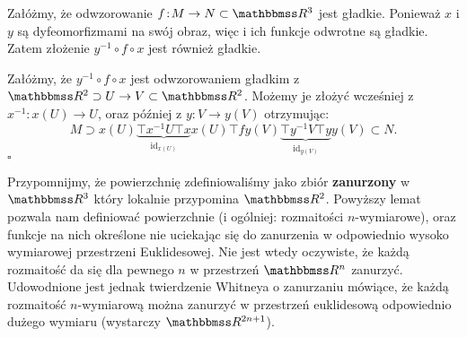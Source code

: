 \pause Załóżmy, że odwzorowanie $f\colon M\to N\subset \R^3$ jest gładkie. Ponieważ $x$ i $y$ są dyfeomorfizmami na swój obraz, więc i ich funkcje odwrotne są gładkie. Zatem złożenie $y^{-1}\circ f\circ x$ jest również gładkie.

\pause Załóżmy, że $y^{-1}\circ f\circ x$ jest odwzorowaniem gładkim z $\R^2\supset U\to V\subset \R^2$. Możemy je złożyć wcześniej z $x^{-1}\colon x(U)\to U$, oraz później z $y\colon V\to y(V)$ otrzymując:\pause
\[M \supset x(U)\underbrace{\top{x^{-1}}U\top{x}}_{\operatorname{id}_{x(U)}}x(U)\top{f}y(V) \underbrace{\top{y^{-1}}V\top{y}}_{\operatorname{id}_{y(V)}}y(V)\subset N.\]
\hfill $\square$


\begin{uwaga}
Przypomnijmy, że powierzchnię zdefiniowaliśmy jako zbiór \textbf{zanurzony} w $\R^3$ który lokalnie przypomina $\R^2$.
Powyższy lemat pozwala nam definiować powierzchnie (i ogólniej: rozmaitości $n$-wymiarowe), oraz funkcje na nich określone nie uciekając się do zanurzenia w odpowiednio wysoko wymiarowej przestrzeni Euklidesowej. Nie jest wtedy oczywiste, że każdą rozmaitość da się dla pewnego $n$ w przestrzeń $\R^n$ zanurzyć. Udowodnione jest jednak twierdzenie Whitneya o zanurzaniu mówiące, że każdą rozmaitość $n$-wymiarową można zanurzyć w przestrzeń euklidesową odpowiednio dużego wymiaru (wystarczy $\R^{2n+1}$).
\end{uwaga}
% 

